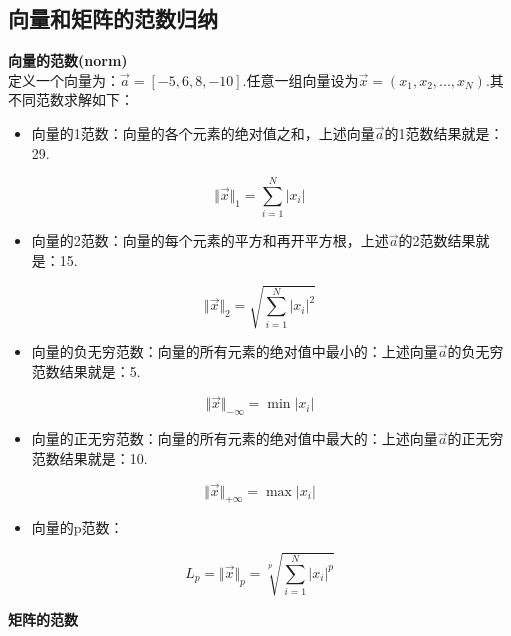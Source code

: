 \subsection{向量和矩阵的范数归纳}\label{ux5411ux91cfux548cux77e9ux9635ux7684ux8303ux6570ux5f52ux7eb3}

\textbf{向量的范数(norm)}\\
​
定义一个向量为：\(\vec{a}=[-5, 6, 8, -10]\).任意一组向量设为\(\vec{x}=(x_1,x_2,...,x_N)\).其不同范数求解如下：

\begin{itemize}
 
\item
  向量的1范数：向量的各个元素的绝对值之和，上述向量\(\vec{a}\)的1范数结果就是：29.
\end{itemize}

\[
\Vert\vec{x}\Vert_1=\sum_{i=1}^N\vert{x_i}\vert
\]

\begin{itemize}
 
\item
  向量的2范数：向量的每个元素的平方和再开平方根，上述\(\vec{a}\)的2范数结果就是：15.
\end{itemize}

\[
\Vert\vec{x}\Vert_2=\sqrt{\sum_{i=1}^N{\vert{x_i}\vert}^2}
\]

\begin{itemize}
 
\item
  向量的负无穷范数：向量的所有元素的绝对值中最小的：上述向量\(\vec{a}\)的负无穷范数结果就是：5.
\end{itemize}

\[
\Vert\vec{x}\Vert_{-\infty}=\min{|{x_i}|}
\]

\begin{itemize}
 
\item
  向量的正无穷范数：向量的所有元素的绝对值中最大的：上述向量\(\vec{a}\)的正无穷范数结果就是：10.
\end{itemize}

\[
\Vert\vec{x}\Vert_{+\infty}=\max{|{x_i}|}
\]

\begin{itemize}
 
\item
  向量的p范数：
\end{itemize}

\[
L_p=\Vert\vec{x}\Vert_p=\sqrt[p]{\sum_{i=1}^{N}|{x_i}|^p}
\]

\textbf{矩阵的范数}


